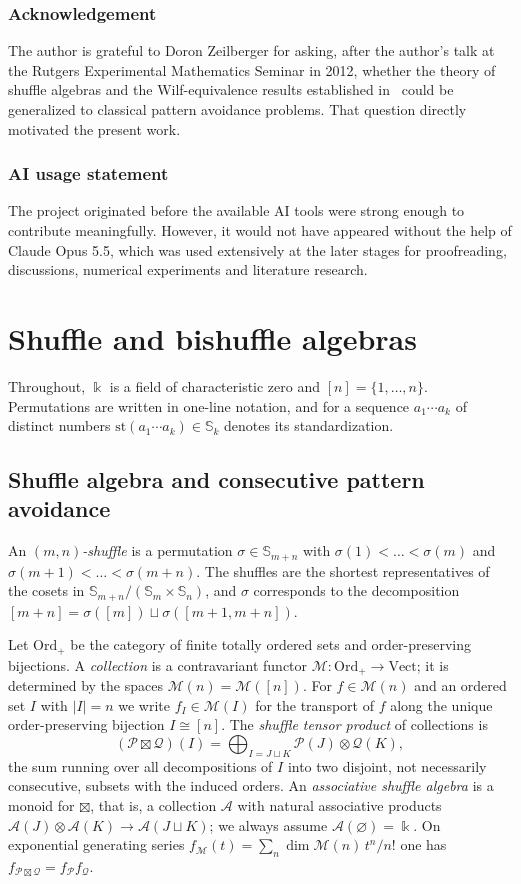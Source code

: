\documentclass[11pt]{amsart}
\theoremstyle{definition}
\theoremstyle{remark}
\newcommand{\bS}{\mathbb{S}}
\newcommand{\kk}{\Bbbk}
\newcommand{\Ord}{\mathrm{Ord}_+}
\newcommand{\Vect}{\mathrm{Vect}}
\newcommand{\st}{\mathrm{st}}
\newcommand{\cA}{\mathscr{A}}
\newcommand{\cM}{\mathscr{M}}
\begin{document}
\subsubsection*{{\bf {Acknowledgement}}}
The author is grateful to Doron Zeilberger for asking, after the author's talk at the Rutgers Experimental Mathematics Seminar in 2012, whether the theory of shuffle algebras and the Wilf-equivalence results established in~\cite{DK} could be generalized to classical pattern avoidance problems. That question directly motivated the present work.

\subsubsection*{{\bf AI usage statement}}
The project originated before the available AI tools were strong enough to contribute meaningfully. However, it would not have appeared without the help of Claude Opus 5.5, which was used extensively at the later stages for proofreading, discussions, numerical experiments and literature research.

\section{Shuffle and bishuffle algebras}\label{sec:algebras}

Throughout, $\kk$ is a field of characteristic zero and $[n]=\{1,\dots,n\}$. Permutations are written in one-line notation, and for a sequence $a_1\cdots a_k$ of distinct numbers $\st(a_1\cdots a_k)\in\bS_k$ denotes its standardization.

\subsection{Shuffle algebra and consecutive pattern avoidance}\label{sec:shuffle}

An \emph{$(m,n)$-shuffle} is a permutation $\sigma\in\bS_{m+n}$ with $\sigma(1)<\dots<\sigma(m)$ and $\sigma(m+1)<\dots<\sigma(m+n)$. The shuffles are the shortest representatives of the cosets in $\bS_{m+n}/(\bS_m\times\bS_n)$, and $\sigma$ corresponds to the decomposition $[m+n]=\sigma([m])\sqcup\sigma([m+1,m+n])$.

Let $\Ord$ be the category of finite totally ordered sets and order-preserving bijections. A \emph{collection} is a contravariant functor $\cM\colon\Ord\to\Vect$; it is determined by the spaces $\cM(n)=\cM([n])$. For $f\in\cM(n)$ and an ordered set $I$ with $|I|=n$ we write $f_I\in\cM(I)$ for the transport of $f$ along the unique order-preserving bijection $I\cong[n]$. The \emph{shuffle tensor product} of collections is
\[
(\mathscr P\boxtimes\mathscr Q)(I)=\bigoplus_{I=J\sqcup K}\mathscr P(J)\otimes\mathscr Q(K),
\]
the sum running over all decompositions of $I$ into two disjoint, not necessarily consecutive, subsets with the induced orders. An \emph{associative shuffle algebra} is a monoid for $\boxtimes$, that is, a collection $\cA$ with natural associative products $\cA(J)\otimes\cA(K)\to\cA(J\sqcup K)$; we always assume $\cA(\varnothing)=\kk$. On exponential generating series $f_\cM(t)=\sum_n\dim\cM(n)\,t^n/n!$ one has $f_{\mathscr P\boxtimes\mathscr Q}=f_{\mathscr P}f_{\mathscr Q}$.
\end{document}
